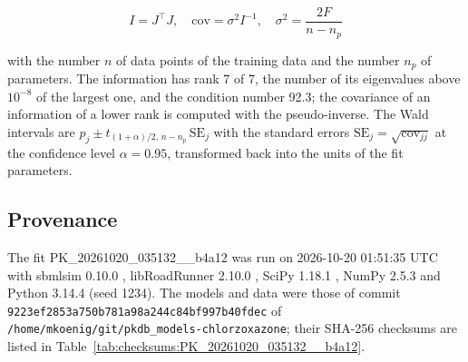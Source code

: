 \documentclass{article}
\begin{document}
\begin{equation}
I = J^\top J, \quad \mathrm{cov} = \sigma^2 I^{-1}, \quad \sigma^2 = \frac{2 F}{n - n_p}
\end{equation}

with the number $n$ of data points of the training data and the number $n_p$ of parameters. The information has rank 7 of 7, the number of its eigenvalues above $10^{-8}$ of the largest one, and the condition number 92.3; the covariance of an information of a lower rank is computed with the pseudo-inverse. The Wald intervals are $\hat{p}_j \pm t_{(1+\alpha)/2,\, n-n_p}\, \mathrm{SE}_j$ with the standard errors $\mathrm{SE}_j = \sqrt{\mathrm{cov}_{jj}}$ at the confidence level $\alpha = 0.95$, transformed back into the units of the fit parameters.

\subsection{Provenance}

The fit PK\_20261020\_035132\_\_b4a12 was run on 2026-10-20 01:51:35 UTC with sbmlsim 0.10.0 \cite{Koenig2026_sbmlsim}, libRoadRunner 2.10.0 \cite{Welsh2023}, SciPy 1.18.1 \cite{Virtanen2020}, NumPy 2.5.3 \cite{Harris2020} and Python 3.14.4 (seed 1234). The models and data were those of commit \texttt{9223ef2853a750b781a98a244c84bf997b40fdec} of \texttt{/home/mkoenig/git/pkdb\_models-chlorzoxazone}; their SHA-256 checksums are listed in Table~\ref{tab:checksums:PK_20261020_035132__b4a12}.
\end{document}
